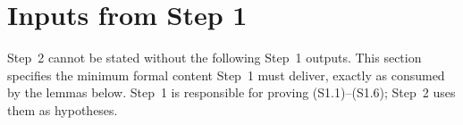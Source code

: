 
\begin{abstract}
Step 2 transports a \emph{global} low-conductance assumption on a cut $S \subseteq \lext(P)$
into a \emph{per-fiber} structural statement: on most rich good fibers $\fib_{x,y}$, the
image $A_{x,y} = \pi_{x,y}(S \cap \fib_{x,y})$ is close to a monotone staircase region in
the planar grid $D_{x,y} \subseteq [0,t]^2$. The core input is a weak planar isoperimetric
stability result (``small grid boundary $\Rightarrow$ close to staircase''). The Step~1
dependencies are made explicit so downstream steps (3, 4, 6) can cite the
conclusion cleanly.
\end{abstract}


\section{Inputs from Step 1}
\label{sec:step1-inputs}

Step~2 cannot be stated without the following Step~1 outputs. This section specifies
the minimum formal content Step~1 must deliver, exactly as consumed by the lemmas
below. Step~1 is responsible for proving
(S1.1)--(S1.6); Step~2 uses them as hypotheses.

